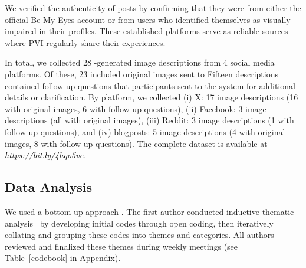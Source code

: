 We verified the authenticity of posts by confirming that they were from either the official Be My Eyes account or from users who identified themselves as visually impaired in their profiles. These established platforms serve as reliable sources where PVI regularly share their experiences. 


In total, we collected 28 \sbma-generated image descriptions from 4 social media platforms. Of these, 23 included original images sent to \sbma{}  Fifteen descriptions contained follow-up questions that participants sent to the system for additional details or clarification. 
By platform, we collected 
(i) X: 17 image descriptions (16 with original images, 6 with follow-up questions), 
(ii) Facebook: 3 image descriptions (all with original images), 
(iii) Reddit: 3 image descriptions (1 with follow-up questions), and 
(iv) blogposts: 5 image descriptions (4 with original images, 8 with follow-up questions). 
The complete dataset is available at \href{https://bit.ly/4hqo5ve}{\textit{\textcolor{black}{https://bit.ly/4hqo5ve}}}.






\subsection{Data Analysis}


We used a bottom-up approach . The first author conducted inductive thematic analysis~\cite{braun2006using} by developing initial codes through open coding, then iteratively collating and grouping these codes into themes and categories. All authors reviewed and finalized these themes during weekly meetings (see Table~\ref{codebook} in Appendix). 



